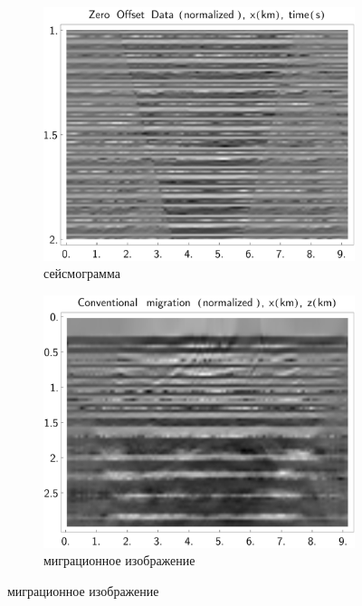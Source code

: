 \documentclass{article}
\begin{document}
\begin{figure}[tb]
\centering
\begin{subfigure}{.3333\textwidth}\includegraphics[width=\textwidth]{pic/report_april/zo_seism_bad_norm}\caption{сейсмограмма}\end{subfigure}%
\begin{subfigure}{.3333\textwidth}\includegraphics[width=\textwidth]{pic/report_april/zo_migr_bad_norm}\caption{миграционное изображение}\end{subfigure}%

\end{figure}
\end{document}
